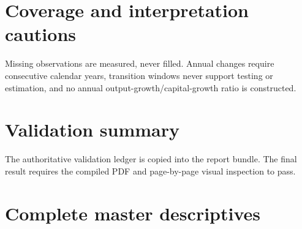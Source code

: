 \documentclass[11pt]{article}
\begin{document}
\section{Coverage and interpretation cautions}
Missing observations are measured, never filled. Annual changes require consecutive calendar years, transition windows never support testing or estimation, and no annual output-growth/capital-growth ratio is constructed.
\section{Validation summary}
The authoritative validation ledger is copied into the report bundle. The final result requires the compiled PDF and page-by-page visual inspection to pass.
\appendix
\section{Complete master descriptives}

\end{document}
